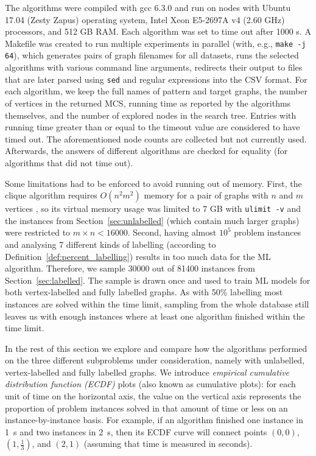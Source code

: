 \documentclass{l4proj}
\theoremstyle{definition}
\theoremstyle{remark}
\begin{document}
The algorithms were compiled with gcc 6.3.0 and run on nodes with Ubuntu 17.04
(Zesty Zapus) operating system, Intel Xeon E5-2697A v4 (2.60 GHz) processors,
and 512 GB RAM. Each algorithm was set to time out after \num{1000} s. A
Makefile was created to run multiple experiments in parallel (with, e.g.,
\texttt{make -j 64}), which generates pairs of graph filenames for all datasets,
runs the selected algorithms with various command line arguments, redirects
their output to files that are later parsed using \texttt{sed} and regular
expressions into the CSV format. For each algorithm, we keep the full names of
pattern and target graphs, the number of vertices in the returned MCS, running
time as reported by the algorithms themselves, and the number of explored nodes
in the search tree. Entries with running time greater than or equal to the
timeout value are considered to have timed out. The aforementioned node counts
are collected but not currently used. Afterwards, the answers of different
algorithms are checked for equality (for algorithms that did not time out).

Some limitations had to be enforced to avoid running out of memory. First, the
clique algorithm requires $O(n^2m^2)$ memory for a pair of graphs with $n$ and
$m$ vertices \cite{DBLP:conf/aaai/HoffmannMR17, DBLP:conf/cp/McCreeshNPS16}, so
its virtual memory usage was limited to 7 GB with \texttt{ulimit -v} and the
instances from Section~\ref{sec:unlabelled} (which contain much larger graphs)
were restricted to $m \times n < \num{16000}$. Second, having almost $10^5$
problem instances and analysing 7 different kinds of labelling (according to
Definition~\ref{def:percent_labelling}) results in too much data for the ML
algorithm. Therefore, we sample \num{30000} out of \num{81400} instances from
Section~\ref{sec:labelled}. The sample is drawn once and used to train ML
models for both vertex-labelled and fully labelled graphs. As with 50\%
labelling most instances are solved within the time limit, sampling from the
whole database still leaves us with enough instances where at least one
algorithm finished within the time limit.

In the rest of this section we explore and compare how the algorithms performed
on the three different subproblems under consideration, namely with unlabelled,
vertex-labelled and fully labelled graphs. We introduce
\emph{empirical cumulative distribution function (ECDF)}
plots \cite{10.2307/2334448} (also known as cumulative plots): for each unit of
time on the horizontal axis, the value on the vertical axis represents the
proportion of problem instances solved in that amount of time or less on an
instance-by-instance basis. For example, if an algorithm finished one instance
in 1~s and two instances in 2~s, then its ECDF curve will connect points $(0,
0)$, $(1, \frac{1}{3})$, and $(2, 1)$ (assuming that time is measured in
seconds).
\end{document}

